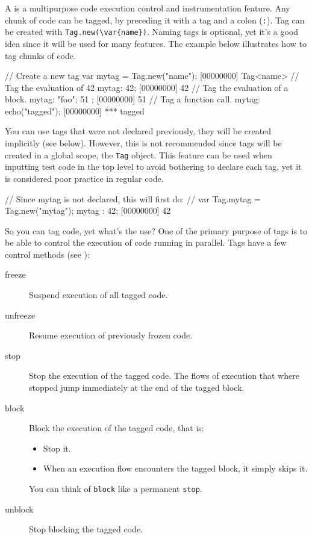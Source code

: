 A  is a multipurpose code execution control and instrumentation
feature. Any chunk of code can be tagged, by preceding it with a tag
and a colon (\lstinline{:}). Tag can be created with
\lstinline|Tag.new(\var{name})|.  Naming tags is optional, yet it's
a good idea since it will be used for many features. The example below
illustrates how to tag chunks of code.

\begin{urbiscript}[firstnumber=1]
// Create a new tag
var mytag = Tag.new("name");
[00000000] Tag<name>
// Tag the evaluation of 42
mytag: 42;
[00000000] 42
// Tag the evaluation of a block.
mytag: { "foo"; 51 };
[00000000] 51
// Tag a function call.
mytag: echo("tagged");
[00000000] *** tagged
\end{urbiscript}

You can use tags that were not declared previously, they will be created
implicitly (see below). However, this is not recommended since
tags will be created in a global scope, the \lstinline{Tag} object. This
feature can be used when inputting test code in the top level to avoid
bothering to declare each tag, yet it is considered poor
practice in regular code.

\begin{urbiscript}[firstnumber=1]
// Since mytag is not declared, this will first do:
// var Tag.mytag = Tag.new("mytag");
mytag : 42;
[00000000] 42
\end{urbiscript}

So you can tag code, yet what's the use? One of the primary purpose of
tags is to be able to control the execution of code running in
parallel. Tags have a few control methods (see ):

\begin{description}
\item[freeze] Suspend execution of all tagged code.
\item[unfreeze] Resume execution of previously frozen code.
\item[stop] Stop the execution of the tagged code. The flows of
  execution that where stopped jump immediately at the end of the
  tagged block.
\item[block] Block the execution of the tagged code, that is:
  \begin{itemize}
  \item Stop it.
  \item When an execution flow encounters the tagged block, it simply
    skips it.
  \end{itemize}
  You can think of \lstinline{block} like a permanent \lstinline{stop}.
\item[unblock] Stop blocking the tagged code.
\end{description}

